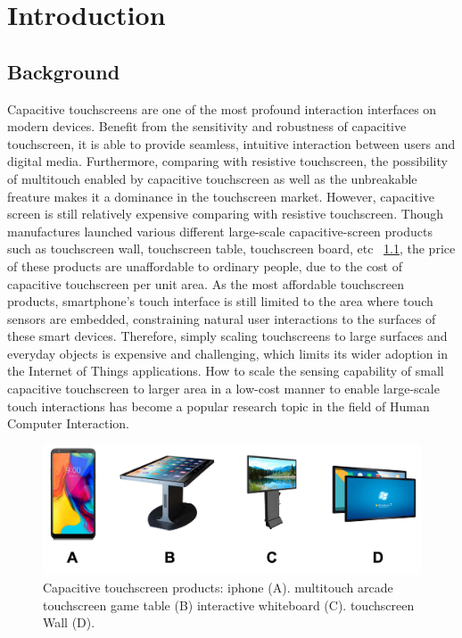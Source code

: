 \chapter{Introduction}

\section{Background}
Capacitive touchscreens are one of the most profound interaction interfaces on modern devices. Benefit from the sensitivity and robustness of capacitive touchscreen, it is able to provide seamless, intuitive interaction between users and digital media. Furthermore, comparing with resistive touchscreen, the possibility of multitouch enabled by capacitive touchscreen as well as the unbreakable freature makes it a dominance in the touchscreen market. However, capacitive screen is still relatively expensive comparing with resistive touchscreen. Though manufactures launched various different large-scale capacitive-screen products such as touchscreen wall, touchscreen table, touchscreen board, etc ~\ref{fig:touchscreen-products}, the price of these products are unaffordable to ordinary people, due to the cost of capacitive touchscreen per unit area. As the most affordable touchscreen products, smartphone's touch interface is still limited to the area where touch sensors are embedded, constraining natural user interactions to the surfaces of these smart devices. Therefore, simply scaling touchscreens to large surfaces and everyday objects is expensive and challenging, which limits its wider adoption in the Internet of Things applications. How to scale the sensing capability of small capacitive touchscreen to larger area in a low-cost manner to enable large-scale touch interactions has become a popular research topic in the field of Human Computer Interaction.

\begin{figure}[ht]
  \centering
    \includegraphics[width=0.8\columnwidth]{figures/touchproducts.png}
    \setlength{\belowcaptionskip}{-8pt}
    \caption{Capacitive touchscreen products: iphone (A). multitouch arcade touchscreen game table (B) interactive whiteboard (C). touchscreen Wall (D).}
    \label{fig:touchscreen-products}
  
\end{figure}

